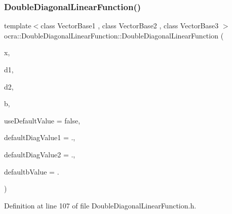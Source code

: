 \subsubsection{\texorpdfstring{Double\+Diagonal\+Linear\+Function()}{DoubleDiagonalLinearFunction()}\hspace{0.1cm}{\footnotesize\ttfamily [1/4]}}
{\footnotesize\ttfamily template$<$class Vector\+Base1 , class Vector\+Base2 , class Vector\+Base3 $>$ \\
ocra\+::\+Double\+Diagonal\+Linear\+Function\+::\+Double\+Diagonal\+Linear\+Function (\begin{DoxyParamCaption}\item[{\hyperlink{classocra_1_1Variable}{Variable} \&}]{x,  }\item[{const Vector\+Base1 \&}]{d1,  }\item[{const Vector\+Base2 \&}]{d2,  }\item[{const Vector\+Base3 \&}]{b,  }\item[{const bool}]{use\+Default\+Value = {\ttfamily false},  }\item[{const double}]{default\+Diag\+Value1 = {.},  }\item[{const double}]{default\+Diag\+Value2 = {.},  }\item[{const double}]{defaultb\+Value = {.} }\end{DoxyParamCaption})\hspace{0.3cm}{\ttfamily [inline]}}



Definition at line 107 of file Double\+Diagonal\+Linear\+Function.\+h.

\hypertarget{classocra_1_1DoubleDiagonalLinearFunction_a96c59d997d8ec798745389d98c2d5e63}{}\label{classocra_1_1DoubleDiagonalLinearFunction_a96c59d997d8ec798745389d98c2d5e63} 

